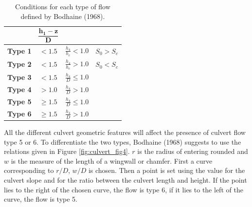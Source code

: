 \begin{table}[H]
\caption{Conditions for each type of flow defined by Bodhaine (1968).}\label{tab:culvert_tab1}
\begin{center}\begin{tabular}{|c|c|c|c|}
\hline
~ & $\mathbf{\dfrac{h_1-z}{D}}$ & ~ & ~\\
\hline
\textbf{Type 1} & $<1.5$    &  $\frac{h_4}{h_c} < 1.0$ & $S_0 > S_c$\\
\hline
\textbf{Type 2} & $<1.5$    &  $\frac{h_4}{h_c} > 1.0$ & $S_0 < S_c$\\
\hline
\textbf{Type 3} & $<1.5$    & $\frac{h_4}{D} \le 1.0$ & ~\\
\hline
\textbf{Type 4} & $> 1.0$   & $\frac{h_4}{D} > 1.0$ & ~\\
\hline
\textbf{Type 5} & $\ge 1.5$ & $\frac{h_4}{D} \le 1.0$ & ~\\
\hline
\textbf{Type 6} & $\ge 1.5$ & $\frac{h_4}{D} > 1.0$  & ~\\
\hline
\end{tabular}\end{center}
\end{table}

All the different culvert geometric features will affect the presence of culvert flow type 5 or 6.
To differentiate the two types, Bodhaine (1968) suggests to use the relations given in Figure \ref{fig:culvert_fig4}.
$r$ is the radius of entering rounded and $w$ is the measure of the length of a wingwall 
or chamfer. First a curve corresponding to $r/D$, $w/D$ is chosen. 
Then a point is set using the value for the culvert slope and for the ratio 
between the culvert length and height. 
If the point lies to the right of the chosen curve, the flow is type 6, 
if it lies to the left of the curve, the flow is type 5.

